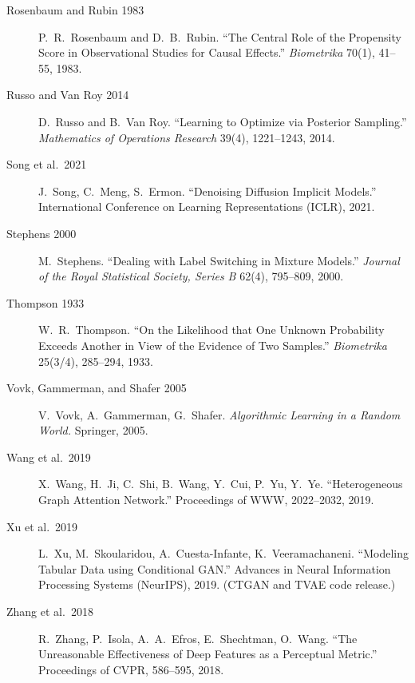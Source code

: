 \documentclass{article}
\begin{document}
\begin{description}
\item[Rosenbaum and Rubin 1983] P.\ R.\ Rosenbaum and D.\ B.\ Rubin. ``The Central Role of the Propensity Score in Observational Studies for Causal Effects.'' \emph{Biometrika} 70(1), 41--55, 1983.
\item[Russo and Van Roy 2014] D.\ Russo and B.\ Van Roy. ``Learning to Optimize via Posterior Sampling.'' \emph{Mathematics of Operations Research} 39(4), 1221--1243, 2014.
\item[Song et al.\ 2021] J.\ Song, C.\ Meng, S.\ Ermon. ``Denoising Diffusion Implicit Models.'' International Conference on Learning Representations (ICLR), 2021.
\item[Stephens 2000] M.\ Stephens. ``Dealing with Label Switching in Mixture Models.'' \emph{Journal of the Royal Statistical Society, Series B} 62(4), 795--809, 2000.
\item[Thompson 1933] W.\ R.\ Thompson. ``On the Likelihood that One Unknown Probability Exceeds Another in View of the Evidence of Two Samples.'' \emph{Biometrika} 25(3/4), 285--294, 1933.
\item[Vovk, Gammerman, and Shafer 2005] V.\ Vovk, A.\ Gammerman, G.\ Shafer. \emph{Algorithmic Learning in a Random World.} Springer, 2005.
\item[Wang et al.\ 2019] X.\ Wang, H.\ Ji, C.\ Shi, B.\ Wang, Y.\ Cui, P.\ Yu, Y.\ Ye. ``Heterogeneous Graph Attention Network.'' Proceedings of WWW, 2022--2032, 2019.
\item[Xu et al.\ 2019] L.\ Xu, M.\ Skoularidou, A.\ Cuesta-Infante, K.\ Veeramachaneni. ``Modeling Tabular Data using Conditional GAN.'' Advances in Neural Information Processing Systems (NeurIPS), 2019. (CTGAN and TVAE code release.)
\item[Zhang et al.\ 2018] R.\ Zhang, P.\ Isola, A.\ A.\ Efros, E.\ Shechtman, O.\ Wang. ``The Unreasonable Effectiveness of Deep Features as a Perceptual Metric.'' Proceedings of CVPR, 586--595, 2018.
\end{description}
\end{document}
